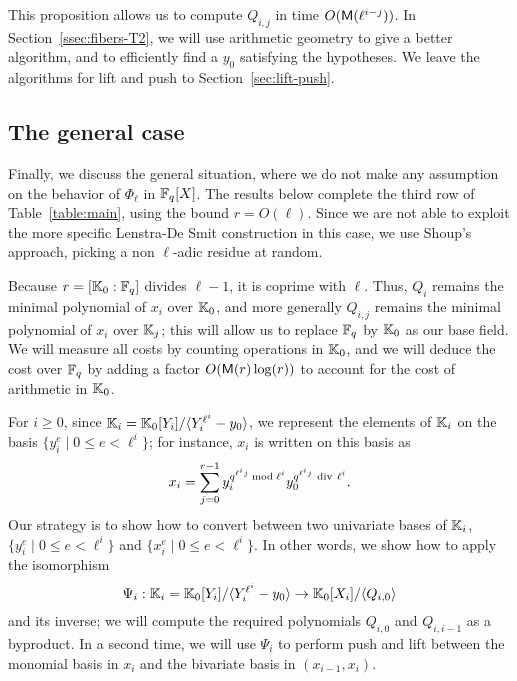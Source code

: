 \documentclass{sig-alternate}
\begin{document}
This proposition allows us to compute $Q_{i,j}$ in time
$O(\mathsf{M}(\ell^{i-j}))$. In Section~\ref{ssec:fibers-T2}, we will use
arithmetic geometry to give a better algorithm, and to efficiently
find a $y_0$ satisfying the hypotheses. We leave the algorithms for
lift and push to Section~\ref{sec:lift-push}.

\subsection{The general case}

Finally, we discuss the general situation, where we do not make any
assumption on the behavior of $\Phi_\ell$ in $\mathbb{F}_q[X]$. The results
below complete the third row of Table~\ref{table:main}, using the
bound $r=O(\ell)$. Since we are not able to exploit the more specific
Lenstra-De Smit construction in this case, we use Shoup's approach,
picking a non $\ell$-adic residue at random.

Because $r=[\mathbb{K}_0 : \mathbb{F}_q]$ divides $\ell-1$, it is coprime with
$\ell$. Thus, $Q_i$ remains the minimal polynomial of $x_i$ over
$\mathbb{K}_0$, and more generally $Q_{i,j}$ remains the minimal polynomial of
$x_i$ over $\mathbb{K}_{j}$; this will allow us to replace $\mathbb{F}_q$ by $\mathbb{K}_0$ as
our base field. We will measure all costs by counting operations in
$\mathbb{K}_0$, and we will deduce the cost over $\mathbb{F}_q$ by adding a factor
$O(\mathsf{M}(r)\log(r))$ to account for the cost of arithmetic in $\mathbb{K}_0$.

For $i \ge 0$, since $\mathbb{K}_i=\mathbb{K}_0[Y_i]/\langle Y_i^{\ell^i}-y_0\rangle$,
we represent the elements of $\mathbb{K}_i$ on the basis $\{y_i^e \mid 0 \le e
< \ell^i\}$; for instance, $x_i$ is written on this basis as
\begin{equation}\label{eq-def:xiyi}
x_i = \sum_{j = 0}^{r-1} y_i^{q^{\ell^i j} \bmod \ell^i}
y_0^{q^{\ell^i j} {\rm~div~} \ell^i}. 
\end{equation}
Our strategy is to show how to convert between two univariate bases of
$\mathbb{K}_i$, $\{y_i^e \mid 0 \le e < \ell^i\}$ and $\{x_i^e \mid 0 \le e <
\ell^i\}$. In other words, we show how to apply the isomorphism
$$\Psi_i: \mathbb{K}_i=\mathbb{K}_0[Y_i]/\langle Y_i^{\ell^i}-y_0\rangle \to
\mathbb{K}_0[X_i]/\langle Q_{i,0}\rangle$$ and its inverse; we will compute
the required polynomials $Q_{i,0}$ and $Q_{i,i-1}$ as a byproduct. In
a second time, we will use $\Psi_i$ to perform push and lift between
the monomial basis in $x_i$ and the bivariate basis in
$(x_{i-1},x_i)$.
\end{document}
